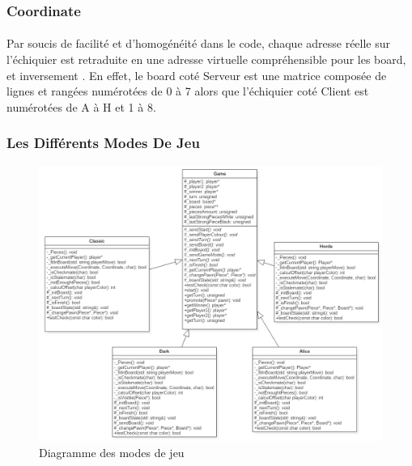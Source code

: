 \documentclass[10pt, a4paper]{article}
\begin{document}
\subsubsection{Coordinate}
\paragraph{}Par soucis de facilité et d'homogénéité dans le code, chaque adresse réelle sur l'échiquier est retraduite en une adresse virtuelle compréhensible pour les board, et inversement . En effet, le board coté Serveur est une matrice composée de lignes et rangées numérotées de 0 à 7 alors que l'échiquier coté Client est numérotées de A à H et 1 à 8.

\subsubsection{Les Différents Modes De Jeu}
\begin{figure}[h]
\centering
\includegraphics[scale=0.5]{mode_chess.png}
\caption{Diagramme des modes de jeu}
\label{CD} %
\end{figure}
\end{document}
